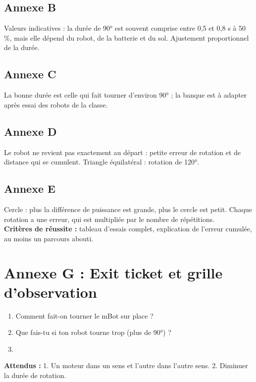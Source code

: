 \documentclass[11pt,a4paper]{article}
\begin{document}
\subsection*{Annexe B}
Valeurs indicatives : la durée de 90° est souvent comprise entre 0,5 et 0,8 s à 50 \%, mais elle dépend du robot, de la batterie et du sol. Ajustement proportionnel de la durée.

\subsection*{Annexe C}
La bonne durée est celle qui fait tourner d'environ 90° ; la banque est à adapter après essai des robots de la classe.

\subsection*{Annexe D}
Le robot ne revient pas exactement au départ : petite erreur de rotation et de distance qui se cumulent. Triangle équilatéral : rotation de 120°.

\subsection*{Annexe E}
Cercle : plus la différence de puissance est grande, plus le cercle est petit. Chaque rotation a une erreur, qui est multipliée par le nombre de répétitions.\\
\textbf{Critères de réussite :} tableau d'essais complet, explication de l'erreur cumulée, au moins un parcours abouti.

\newpage
\section*{Annexe G : Exit ticket et grille d'observation}

\begin{enumerate}
 \item Comment fait-on tourner le mBot sur place ?\\ \lig
 \item Que fais-tu si ton robot tourne trop (plus de 90°) ?\\ \lig
 \item \autoeval
\end{enumerate}
\textbf{Attendus :} 1. Un moteur dans un sens et l'autre dans l'autre sens. 2. Diminuer la durée de rotation.

\bigskip
{}
\end{document}
